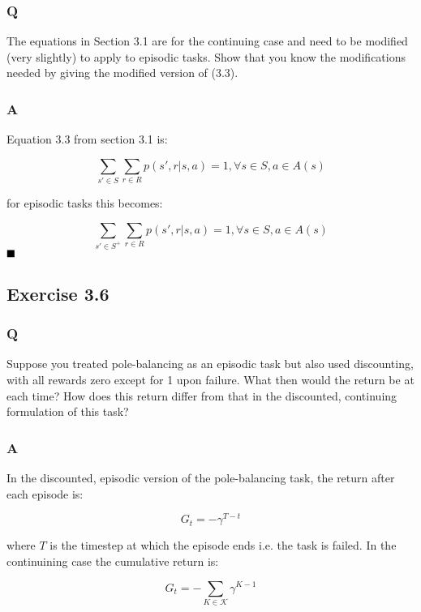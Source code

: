 \subsubsection*{Q}
The equations in Section 3.1 are for the continuing case and need to be modified (very slightly) to apply to episodic tasks. Show that you know the modifications needed by giving the modified version of (3.3). 

\subsubsection*{A}
Equation 3.3 from section 3.1 is:

\begin{equation}
	\sum_{s' \in S} \sum_{r \in R} p(s', r | s, a) = 1, \forall s \in S, a \in A(s)
\end{equation}

for episodic tasks this becomes:

\begin{equation}
\sum_{s' \in S^+} \sum_{r \in R} p(s', r | s, a) = 1, \forall s \in S, a \in A(s)
\end{equation}
$
\hfill \blacksquare
$

\subsection{Exercise 3.6}
\subsubsection*{Q}
Suppose you treated pole-balancing as an episodic task but also used discounting, with all rewards zero except for 1 upon failure. What then would the return be at each time? How does this return differ from that in the discounted, continuing formulation of this task? 

\subsubsection*{A}
In the discounted, episodic version of the pole-balancing task, the return after each episode is:

\begin{equation}
	G_t = -\gamma^{T-t}
\end{equation}

where \(T\) is the timestep at which the episode ends i.e. the task is failed. In the continuining case the cumulative return is:

\begin{equation}
G_t = -\sum_{K\in\mathcal{K}} \gamma^{K-1}
\end{equation}

